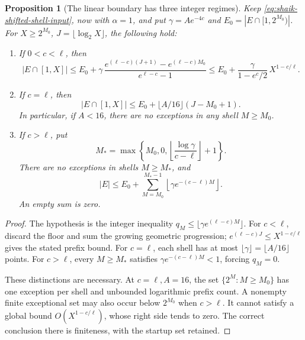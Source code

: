 \documentclass[11pt]{article}
\newtheorem{proposition}{Proposition}
\theoremstyle{remark}\newtheorem{remark}[proposition]{Remark}
\begin{document}
\begin{proposition}[The linear boundary has three integer regimes]
\label{prop:shaik-linear-shell}
Keep \eqref{eq:shaik-shifted-shell-input}, now with \(\alpha=1\),
and put \(\gamma=Ae^{-4c}\) and
\(E_0=|E\cap[1,2^{M_0})|\).
For \(X\ge2^{M_0}\), \(J=\lfloor\log_2X\rfloor\), the following hold:
\begin{enumerate}
\item If \(0<c<\ell\), then
\[
 |E\cap[1,X]|\le E_0+
 \gamma\,\frac{e^{(\ell-c)(J+1)}-e^{(\ell-c)M_0}}
                   {e^{\ell-c}-1}
 \le E_0+\frac{\gamma}{1-e^{c}/2}\,X^{1-c/\ell}.
\]
\item If \(c=\ell\), then
\[
 |E\cap[1,X]|\le E_0+\lfloor A/16\rfloor(J-M_0+1).
\]
In particular, if \(A<16\), there are no exceptions in any shell
\(M\ge M_0\).
\item If \(c>\ell\), put
\[
 M_*=\max\left\{M_0,0,
       \left\lfloor\frac{\log\gamma}{c-\ell}\right\rfloor+1\right\}.
\]
There are no exceptions in shells \(M\ge M_*\), and
\[
 |E|\le E_0+\sum_{M=M_0}^{M_*-1}
                     \left\lfloor\gamma e^{-(c-\ell)M}\right\rfloor.
\]
An empty sum is zero.
\end{enumerate}
\end{proposition}
\begin{proof}
The hypothesis is the integer inequality
\(q_M\le\lfloor\gamma e^{(\ell-c)M}\rfloor\).
For \(c<\ell\), discard the floor and sum the growing geometric
progression; \(e^{(\ell-c)J}\le X^{1-c/\ell}\) gives the stated
prefix bound. For \(c=\ell\), each shell has at most
\(\lfloor\gamma\rfloor=\lfloor A/16\rfloor\) points.
For \(c>\ell\), every \(M\ge M_*\) satisfies
\(\gamma e^{-(c-\ell)M}<1\), forcing \(q_M=0\).

These distinctions are necessary. At \(c=\ell,A=16\), the set
\(\{2^M:M\ge M_0\}\) has one exception per shell and unbounded
logarithmic prefix count. A nonempty finite exceptional set may
also occur below \(2^{M_0}\) when \(c>\ell\).
It cannot satisfy a global bound \(O(X^{1-c/\ell})\), whose right
side tends to zero. The correct conclusion there is finiteness,
with the startup set retained.
\end{proof}
\end{document}
